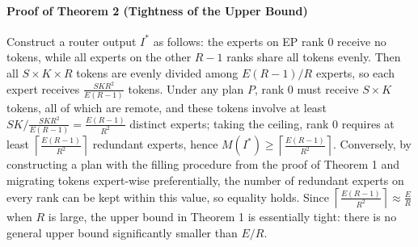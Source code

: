 \paragraph{Proof of Theorem 2 (Tightness of the Upper Bound)} 
Construct a router output $I^*$ as follows: the experts on EP rank 0 receive no tokens, while all experts on the other $R-1$ ranks share all tokens evenly. Then all $S \times K \times R$ tokens are evenly divided among $E(R-1)/R$ experts, so each expert receives $\frac{SKR^2}{E(R-1)}$ tokens. Under any plan $P$, rank 0 must receive $S \times K$ tokens, all of which are remote, and these tokens involve at least $SK \big/ \frac{SKR^2}{E(R-1)} = \frac{E(R-1)}{R^2}$ distinct experts; taking the ceiling, rank 0 requires at least $\left\lceil\frac{E(R-1)}{R^2}\right\rceil$ redundant experts, hence $M(I^*) \ge \left\lceil\frac{E(R-1)}{R^2}\right\rceil$. Conversely, by constructing a plan with the filling procedure from the proof of Theorem 1 and migrating tokens expert-wise preferentially, the number of redundant experts on every rank can be kept within this value, so equality holds. Since $\left\lceil\frac{E(R-1)}{R^2}\right\rceil \approx \frac{E}{R}$ when $R$ is large, the upper bound in Theorem 1 is essentially tight: there is no general upper bound significantly smaller than $E/R$.


